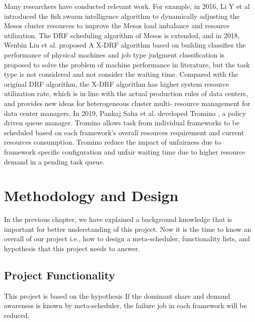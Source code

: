 \documentclass[12pt,oneside,openright,a4paper]{cpe-english-project}
\begin{document}
\hspace{10mm}Many researchers have conducted relevant work. For example, in 2016, Li Y et al \cite{fishSwarm} introduced the fish swarm intelligence algorithm to dynamically adjusting the Mesos cluster resources to improve the Mesos load imbalance and resource utilization. The DRF scheduling algorithm of Mesos is extended, and in 2018, Wenbin Liu et al. proposed A X-DRF algorithm \cite{xdrf} based on building classifies the performance of physical machines and job type judgment classification is proposed to solve the problem of machine performance in literature, but the task type is not considered and not consider the waiting time. Compared with the original DRF algorithm, the X-DRF algorithm has higher system resource utilization rate, which is in line with the actual production rules of data centers, and provides new ideas for heterogeneous cluster multi- resource management for data center managers. In 2019, Pankaj Saha et al. developed Tromino \cite{tromino}, a policy driven queue manager. Tromino allows task from individual frameworks to be scheduled based on each framework’s overall resources requirement and current resources consumption. Tromino reduce the impact of unfairness due to framework specific configuration and unfair waiting time due to higher resource demand in a pending task queue.

\chapter{Methodology and Design}

\hspace{10mm}In the previous chapter, we have explained a background knowledge that is important for better understanding of this project. Now it is the time to know an overall of our project i.e., how to design a meta-scheduler, functionality lists, and hypothesis that this project needs to answer.

\section{Project Functionality}
\hspace{10mm}This project is based on the hypothesis If the dominant share and demand awareness is known by meta-scheduler, the failure job in each framework will be reduced.
\end{document}
